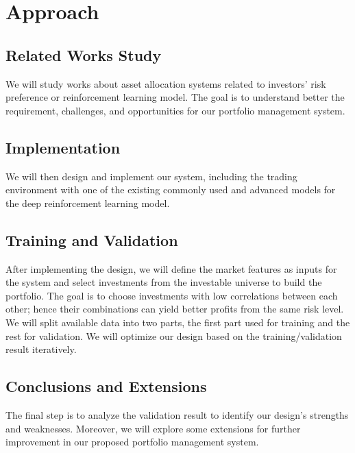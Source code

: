 \chapter{Approach}
\section{Related Works Study}
We will study works about asset allocation systems related to investors' risk preference or reinforcement learning model. The goal is to understand better the requirement, challenges, and opportunities for our portfolio management system.
\section{Implementation}
We will then design and implement our system, including the trading environment with one of the existing commonly used and advanced models for the deep reinforcement learning model. 
\section{Training and Validation}
After implementing the design, we will define the market features as inputs for the system and select investments from the investable universe to build the portfolio. The goal is to choose investments with low correlations between each other; hence their combinations can yield better profits from the same risk level. We will split available data into two parts, the first part used for training and the rest for validation. We will optimize our design based on the training/validation result iteratively.
\section{Conclusions and Extensions}
The final step is to analyze the validation result to identify our design's strengths and weaknesses. Moreover, we will explore some extensions for further improvement in our proposed portfolio management system.